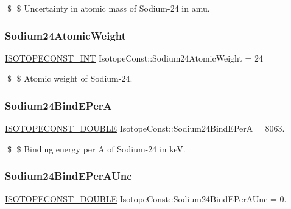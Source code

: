 \$ \$ Uncertainty in atomic mass of Sodium-\/24 in amu. \mbox{\label{group___isotope_const-_sodium-_na24_gab20d65a10f0068358b1600c76f66f694}} 
\subsubsection{\texorpdfstring{Sodium24\+Atomic\+Weight}{Sodium24AtomicWeight}}
{\footnotesize\ttfamily \mbox{\hyperlink{group___isotope_const-_macros_ga5f18360b3e99483a35c32d789e62621c}{I\+S\+O\+T\+O\+P\+E\+C\+O\+N\+S\+T\+\_\+\+I\+NT}} Isotope\+Const\+::\+Sodium24\+Atomic\+Weight = 24}

\$ \$ Atomic weight of Sodium-\/24. \mbox{\label{group___isotope_const-_sodium-_na24_gab995cd15dba58271344996f6c73dbd97}} 
\subsubsection{\texorpdfstring{Sodium24\+Bind\+E\+PerA}{Sodium24BindEPerA}}
{\footnotesize\ttfamily \mbox{\hyperlink{group___isotope_const-_macros_ga8f45a7272ce02c0b4c65c44636ed719a}{I\+S\+O\+T\+O\+P\+E\+C\+O\+N\+S\+T\+\_\+\+D\+O\+U\+B\+LE}} Isotope\+Const\+::\+Sodium24\+Bind\+E\+PerA = 8063.}

\$ \$ Binding energy per A of Sodium-\/24 in keV. \mbox{\label{group___isotope_const-_sodium-_na24_ga9cb126241781ddfdfc602c0678a9b6e5}} 
\subsubsection{\texorpdfstring{Sodium24\+Bind\+E\+Per\+A\+Unc}{Sodium24BindEPerAUnc}}
{\footnotesize\ttfamily \mbox{\hyperlink{group___isotope_const-_macros_ga8f45a7272ce02c0b4c65c44636ed719a}{I\+S\+O\+T\+O\+P\+E\+C\+O\+N\+S\+T\+\_\+\+D\+O\+U\+B\+LE}} Isotope\+Const\+::\+Sodium24\+Bind\+E\+Per\+A\+Unc = 0.}

